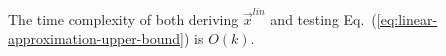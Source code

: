 \begin{Property}
The time complexity of both deriving $\vec{x}^{\mathit{lin}}$ and testing Eq.~(\ref{eq:linear-approximation-upper-bound}) is $O(k)$.
\end{Property}


  




